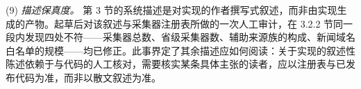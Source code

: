 \documentclass[11pt]{article}
\begin{document}
(9) \textit{{\cjkfont 描\allowbreak 述\allowbreak 保\allowbreak 真\allowbreak 度\allowbreak 。}} {\cjkfont 第} 3 {\cjkfont 节\allowbreak 的\allowbreak 系\allowbreak 统\allowbreak 描\allowbreak 述\allowbreak 是\allowbreak 对\allowbreak 实\allowbreak 现\allowbreak 的\allowbreak 作\allowbreak 者\allowbreak 撰\allowbreak 写\allowbreak 式\allowbreak 叙\allowbreak 述\allowbreak ，\allowbreak 而\allowbreak 非\allowbreak 由\allowbreak 实\allowbreak 现\allowbreak 生\allowbreak 成\allowbreak 的\allowbreak 产\allowbreak 物\allowbreak 。\allowbreak 起\allowbreak 草\allowbreak 后\allowbreak 对\allowbreak 该\allowbreak 叙\allowbreak 述\allowbreak 与\allowbreak 采\allowbreak 集\allowbreak 器\allowbreak 注\allowbreak 册\allowbreak 表\allowbreak 所\allowbreak 做\allowbreak 的\allowbreak 一\allowbreak 次\allowbreak 人\allowbreak 工\allowbreak 审\allowbreak 计\allowbreak ，\allowbreak 在} 3.2.2 {\cjkfont 节\allowbreak 同\allowbreak 一\allowbreak 段\allowbreak 内\allowbreak 发\allowbreak 现\allowbreak 四\allowbreak 处\allowbreak 不\allowbreak 符}------{\cjkfont 采\allowbreak 集\allowbreak 器\allowbreak 总\allowbreak 数\allowbreak 、\allowbreak 省\allowbreak 级\allowbreak 采\allowbreak 集\allowbreak 器\allowbreak 数\allowbreak 、\allowbreak 辅\allowbreak 助\allowbreak 来\allowbreak 源\allowbreak 族\allowbreak 的\allowbreak 构\allowbreak 成\allowbreak 、\allowbreak 新\allowbreak 闻\allowbreak 域\allowbreak 名\allowbreak 白\allowbreak 名\allowbreak 单\allowbreak 的\allowbreak 规\allowbreak 模}------{\cjkfont 均\allowbreak 已\allowbreak 修\allowbreak 正\allowbreak 。\allowbreak 此\allowbreak 事\allowbreak 界\allowbreak 定\allowbreak 了\allowbreak 其\allowbreak 余\allowbreak 描\allowbreak 述\allowbreak 应\allowbreak 如\allowbreak 何\allowbreak 阅\allowbreak 读\allowbreak ：\allowbreak 关\allowbreak 于\allowbreak 实\allowbreak 现\allowbreak 的\allowbreak 叙\allowbreak 述\allowbreak 性\allowbreak 陈\allowbreak 述\allowbreak 依\allowbreak 赖\allowbreak 于\allowbreak 与\allowbreak 代\allowbreak 码\allowbreak 的\allowbreak 人\allowbreak 工\allowbreak 核\allowbreak 对\allowbreak ，\allowbreak 需\allowbreak 要\allowbreak 核\allowbreak 实\allowbreak 某\allowbreak 条\allowbreak 具\allowbreak 体\allowbreak 主\allowbreak 张\allowbreak 的\allowbreak 读\allowbreak 者\allowbreak ，\allowbreak 应\allowbreak 以\allowbreak 注\allowbreak 册\allowbreak 表\allowbreak 与\allowbreak 已\allowbreak 发\allowbreak 布\allowbreak 代\allowbreak 码\allowbreak 为\allowbreak 准\allowbreak ，\allowbreak 而\allowbreak 非\allowbreak 以\allowbreak 散\allowbreak 文\allowbreak 叙\allowbreak 述\allowbreak 为\allowbreak 准\allowbreak 。}
\end{document}
